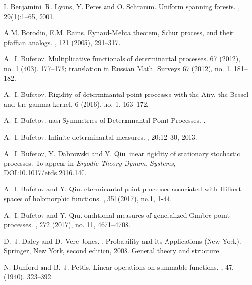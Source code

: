\documentclass[12pt]{paper}
\numberwithin{theorem}{section}
\numberwithin{figure}{section}
\numberwithin{equation}{section}
\begin{document}
\begin{thebibliography}{10}

I. Benjamini, R. Lyons, Y. Peres and O. Schramm.
\newblock Uniform spanning forests.
, 29(1):1--65, 2001.

 A.M. Borodin, E.M. Rains.
 \newblock Eynard-Mehta theorem, Schur process, and their pfaffian analogs.
, 121 (2005), 291--317.

A.~I. Bufetov.
\newblock Multiplicative functionals of determinantal processes.
 67 (2012), no. 1 (403), 177--178;
translation in Russian Math. Surveys 67 (2012), no. 1, 181--182.


A.~I. Bufetov.
\newblock Rigidity of determinantal point processes with the Airy, the Bessel and the gamma kernel.
  6 (2016), no. 1, 163–172.




A.~I. Bufetov.
uasi-{S}ymmetries of {D}eterminantal {P}oint {P}rocesses.
.

A.~I. Bufetov.
\newblock Infinite determinantal measures.
, 20:12--30, 2013.


A.~I. Bufetov, Y. Dabrowski and Y. Qiu.
inear rigidity of stationary stochastic processes.
\newblock To appear in {\em Ergodic Theory Dynam. Systems}, DOI:10.1017/etds.2016.140.



A.~I. Bufetov and Y. Qiu.
eterminantal point processes associated with {H}ilbert spaces of holomorphic functions.
, 351(2017), no.1, 1-44.

A.~I. Bufetov and Y. Qiu.
onditional measures of generalized {G}inibre point processes.
 , 272 (2017), no. 11, 4671--4708.



D.~J. Daley and D.~Vere-Jones.
.
\newblock Probability and its Applications (New York). Springer, New York,
  second edition, 2008.
\newblock General theory and structure.


N. Dunford and B.~J. Pettis.
\newblock Linear operations on summable functions.
, 47, (1940). 323--392.





\end{thebibliography}
\end{document}
